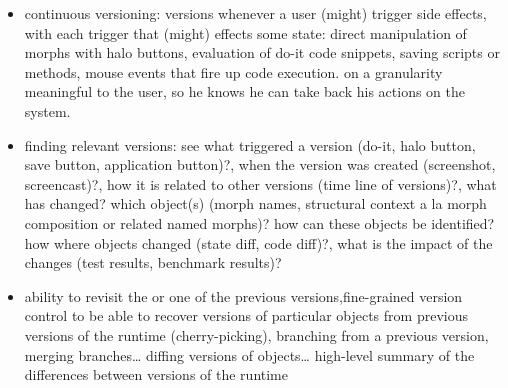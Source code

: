 \begin{itemize}
    \item continuous versioning: versions whenever a user (might) trigger side effects, with each trigger that (might) effects some state: direct manipulation of morphs with halo buttons, evaluation of do-it code snippets, saving scripts or methods, mouse events that fire up code execution.
on a granularity meaningful to the user, so he knows he can take back his actions on the system.
    \item finding relevant versions: see what triggered a version (do-it, halo button, save button, application button)?, when the version was created (screenshot, screencast)?, how it is related to other versions (time line of versions)?, what has changed? which object(s) (morph names, structural context a la morph composition or related named morphs)? how can these objects be identified? how where objects changed (state diff, code diff)?, what is the impact of the changes (test results, benchmark results)?
    \item ability to revisit the or one of the previous versions,fine-grained version control to be able to recover versions of particular objects from previous versions of the runtime (cherry-picking), branching from a previous version, merging branches… diffing versions of objects… high-level summary of the differences between versions of the runtime
\end{itemize}
